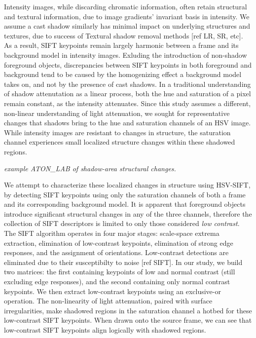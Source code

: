 \documentclass[12pt]{report}
\begin{document}
Intensity images, while discarding chromatic information, often retain structural and textural information, due to image gradients' invariant basis in intensity. We assume a cast shadow similarly has minimal impact on underlying structures and textures, due to success of Textural shadow removal methods [ref LR, SR, etc]. As a result, SIFT keypoints remain largely harmonic between a frame and its background model in intensity images. Exluding the introduction of non-shadow foreground objects, discrepancies between SIFT keypoints in both foreground and background tend to be caused by the homogenizing effect a background model takes on, and not by the presence of cast shadows. In a traditional understanding of shadow attenutation as a linear process, both the hue and saturation of a pixel remain constant, as the intensity attenuates. Since this study assumes a different, non-linear understanding of light attenuation, we sought for representative changes that shadows bring to the hue and saturation channels of an HSV image. While intensity images are resistant to changes in structure, the saturation channel experiences small localized structure changes within these shadowed regions.

\textit{example ATON\_LAB of shadow-area structural changes.}

We attempt to characterize these localized changes in structure using HSV-SIFT, by detecting SIFT keypoints using only the saturation channels of both a frame and its corresponding background model. It is apparent that foreground objects introduce significant structural changes in any of the three channels, therefore the collection of SIFT descriptors is limited to only those considered \textit{low contrast}. The SIFT algorithm operates in four major stages: scale-space extrema extraction, elimination of low-contrast keypoints, elimination of strong edge responses, and the assignment of orientations. Low-contrast detections are eliminated due to their susceptibilty to noise [ref SIFT]. In our study, we build two matrices: the first containing keypoints of low and normal contrast (still excluding edge responses), and the second containing only normal contrast keypoints. We then extract low-contrast keypoints using an exclusive-or operation. The non-linearity of light attenuation, paired with surface irregularities, make shadowed regions in the saturation channel a hotbed for these low-contrast SIFT keypoints. When drawn onto the source frame, we can see that low-contrast SIFT keypoints align logically with shadowed regions. 
\end{document}
